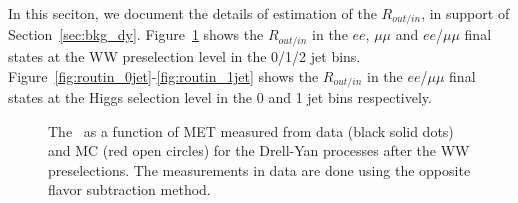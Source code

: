 In this seciton, we document the details of estimation of the $R_{out/in}$, 
in support of Section~\ref{sec:bkg_dy}. 
Figure~\ref{fig:dyr_ww} shows the $R_{out/in}$ in the $ee$, $\mu\mu$ 
and $ee$/$\mu\mu$ final states at the WW preselection level in 
the 0/1/2 jet bins. 
Figure~\ref{fig:routin_0jet}-\ref{fig:routin_1jet} shows the $R_{out/in}$ in the 
$ee$/$\mu\mu$ final states at the Higgs selection level in the 
0 and 1 jet bins respectively. 

\begin{figure}[!hbtp]

\centering
{}
\centering
{}
\caption{
 The \routin\, as a function of MET measured from data (black solid dots) 
and MC (red open circles) for the Drell-Yan processes after the WW preselections. 
The measurements in data are done using the opposite flavor subtraction method. }
\label{fig:dyr_ww}
\end{figure}


